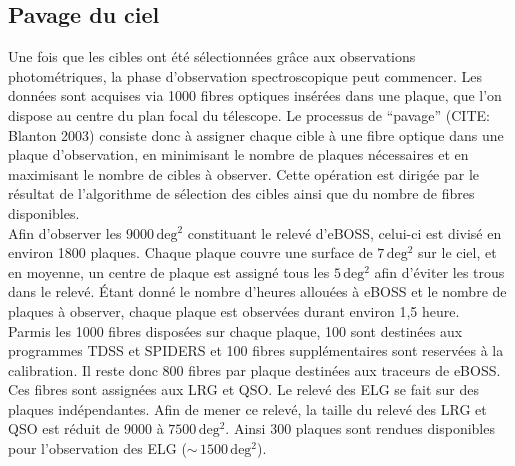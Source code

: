 \documentclass[11pt, twoside, a4paper, openright]{report}
\begin{document}
\subsection{Pavage du ciel}

Une fois que les cibles ont été sélectionnées grâce aux observations photométriques, la phase d'observation spectroscopique peut commencer. Les données sont acquises via \num{1000} fibres optiques insérées dans une plaque, que l'on dispose au centre du plan focal du télescope. 
Le processus de ``pavage'' (CITE: Blanton 2003) consiste donc à assigner chaque cible à une fibre optique dans une plaque d'observation, en minimisant le nombre de plaques nécessaires et en maximisant le nombre de cibles à observer. Cette opération est dirigée par le résultat de l'algorithme de sélection des cibles ainsi que du nombre de fibres disponibles. \\
Afin d'observer les $\num{9000}\,\mathrm{deg^{2}}$ constituant le relevé d'eBOSS, celui-ci est divisé en environ 1800 plaques. Chaque plaque couvre une surface de $7\,\mathrm{deg^{2}}$ sur le ciel, et en moyenne, un centre de plaque est assigné tous les $5\,\mathrm{deg^{2}}$ afin d'éviter les trous dans le relevé. Étant donné le nombre d'heures allouées à eBOSS et le nombre de plaques à observer, chaque plaque est observées durant environ 1,5 heure. \\
Parmis les \num{1000} fibres disposées sur chaque plaque, \num{100} sont destinées aux programmes TDSS et SPIDERS et \num{100} fibres supplémentaires sont reservées à la calibration. Il reste donc \num{800} fibres par plaque destinées aux traceurs de eBOSS. Ces fibres sont assignées aux LRG et QSO. Le relevé des ELG se fait sur des plaques indépendantes. Afin de mener ce relevé, la taille du relevé des LRG et QSO est réduit de \num{9000} à $\num{7500}\,\mathrm{deg^{2}}$. Ainsi \num{300} plaques sont rendues disponibles pour l'observation des ELG ($\sim\,\num{1500}\,\mathrm{deg^{2}}$).
\end{document}
